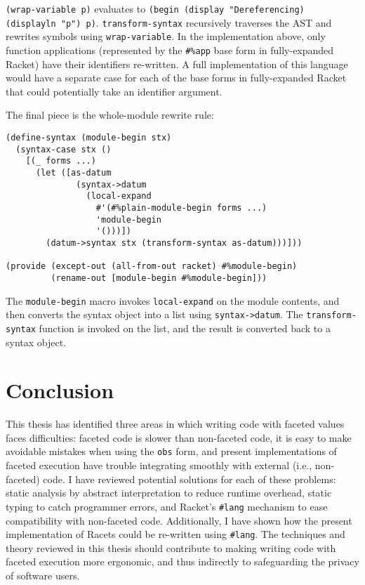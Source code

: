 \documentclass{article}
\begin{document}
\texttt{(wrap-variable p)} evaluates to \texttt{(begin (display "Dereferencing) (displayln "p") p)}. \texttt{transform-syntax} recursively traverses the AST and rewrites symbols using \texttt{wrap-variable}. In the implementation above, only function applications (represented by the \texttt{\#\%app} base form in fully-expanded Racket) have their identifiers re-written. A full implementation of this language would have a separate case for each of the base forms in fully-expanded Racket that could potentially take an identifier argument.

The final piece is the whole-module rewrite rule:

\begin{lstlisting}
(define-syntax (module-begin stx)
  (syntax-case stx ()
    [(_ forms ...)
      (let ([as-datum
              (syntax->datum
                (local-expand
                  #'(#%plain-module-begin forms ...)
                  'module-begin
                  '()))])
        (datum->syntax stx (transform-syntax as-datum)))]))

(provide (except-out (all-from-out racket) #%module-begin)
         (rename-out [module-begin #%module-begin]))
\end{lstlisting}

The \texttt{module-begin} macro invokes \texttt{local-expand} on the module contents, and then converts the syntax object into a list using \texttt{syntax->datum}. The \texttt{transform-syntax} function is invoked on the list, and the result is converted back to a syntax object.



\section{Conclusion}
This thesis has identified three areas in which writing code with faceted values faces difficulties: faceted code is slower than non-faceted code, it is easy to make avoidable mistakes when using the \texttt{obs} form, and present implementations of faceted execution have trouble integrating smoothly with external (i.e., non-faceted) code. I have reviewed potential solutions for each of these problems: static analysis by abstract interpretation to reduce runtime overhead, static typing to catch programmer errors, and Racket's \texttt{\#lang} mechanism to ease compatibility with non-faceted code. Additionally, I have shown how the present implementation of Racets could be re-written using \texttt{\#lang}. The techniques and theory reviewed in this thesis should contribute to making writing code with faceted execution more ergonomic, and thus indirectly to safeguarding the privacy of software users.


\end{document}
